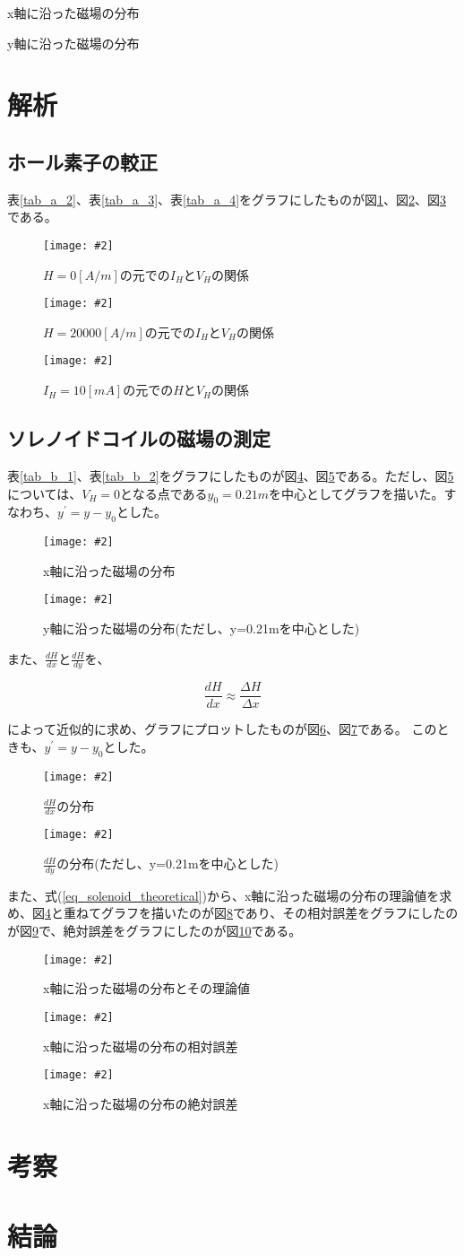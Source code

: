\documentclass[uplatex,11pt]{jsarticle}
\newcommand{\cir}[3]{ %
    \begin{figure}
        \begin{center}
            \texttt{[image: \#2]}
            \caption{#3}
            \label{fg_#1}
         \end{center}
    \end{figure}
}
\newcommand{\tab}[4]{ %
    \begin{table}[htb]
        \centering
        \caption{#3}
        
        \label{tab_#1}
    \end{table}
}
\newcommand{\fr}[1]{図\ref{fg_#1}}
\newcommand{\tr}[1]{表\ref{tab_#1}}
\newcommand{\er}[1]{式(\ref{#1})}
\begin{document}
\tab{b_1}{./csv/jikken_b_1.csv}{x軸に沿った磁場の分布}{3}
\tab{b_2}{./csv/jikken_b_2.csv}{y軸に沿った磁場の分布}{3}

\section{解析}
\subsection{ホール素子の較正}

\tr{a_2}、\tr{a_3}、\tr{a_4}をグラフにしたものが\fr{a_2}、\fr{a_3}、\fr{a_4}である。

\cir{a_2}{./graph/jikken_a_2.png}{ $ H=0[A/m] $の元での$I_H$と$V_H$の関係 }
\cir{a_3}{./graph/jikken_a_3.png}{ $ H=20000[A/m] $の元での$I_H$と$V_H$の関係 }
\cir{a_4}{./graph/jikken_a_4.png}{ $ I_H = 10[mA] $の元での$H$と$V_H$の関係 }

\subsection{ソレノイドコイルの磁場の測定}

\tr{b_1}、\tr{b_2}をグラフにしたものが\fr{b_1}、\fr{b_2}である。ただし、\fr{b_2}については、$V_H = 0$となる点である$y_0=0.21m$を中心としてグラフを描いた。すなわち、$y^{\prime} = y - y_0$とした。

\cir{b_1}{./graph/jikken_b_1.png}{ x軸に沿った磁場の分布 }
\cir{b_2}{./graph/jikken_b_2.png}{ y軸に沿った磁場の分布(ただし、y=0.21mを中心とした) }

また、$ \frac{dH}{dx} $と$ \frac{dH}{dy} $を、

\[
    \frac{dH}{dx} \approx \frac{\Delta H}{ \Delta x }
\]

によって近似的に求め、グラフにプロットしたものが\fr{b_1_differential}、\fr{b_2_differential}である。
このときも、$y^{\prime} = y - y_0$とした。

\cir{b_1_differential}{./graph/jikken_b_1_differential.png}{ $\frac{dH}{dx}$の分布 }
\cir{b_2_differential}{./graph/jikken_b_2_differential.png}{ $\frac{dH}{dy}$の分布(ただし、y=0.21mを中心とした) }

また、\er{eq_solenoid_theoretical}から、x軸に沿った磁場の分布の理論値を求め、\fr{b_1}と重ねてグラフを描いたのが\fr{b_1_theoretical_comparizon}であり、その相対誤差をグラフにしたのが\fr{b_1_relative_error}で、絶対誤差をグラフにしたのが\fr{b_1_absolute_error}である。

\cir{b_1_theoretical_comparizon}{./graph/jikken_b_1_theoretical_comparizon.png}{ x軸に沿った磁場の分布とその理論値 }
\cir{b_1_relative_error}{./graph/jikken_b_1_relative_error.png}{ x軸に沿った磁場の分布の相対誤差 }
\cir{b_1_absolute_error}{./graph/jikken_b_1_absolute_error.png}{ x軸に沿った磁場の分布の絶対誤差 }

\section{考察}
\section{結論}
\end{document}
